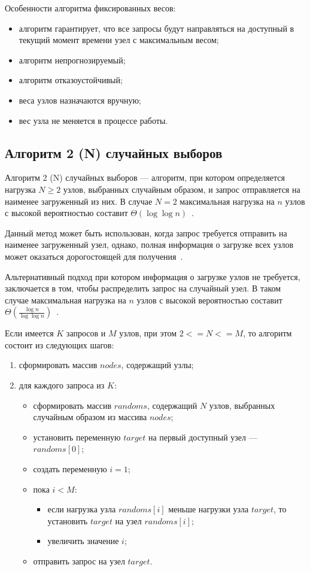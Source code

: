 Особенности алгоритма фиксированных весов:
\begin{itemize}
	\item алгоритм гарантирует, что все запросы будут направляться на доступный в текущий момент времени узел с максимальным весом;
	\item алгоритм непрогнозируемый;
	\item алгоритм отказоустойчивый;
	\item веса узлов назначаются вручную;
	\item вес узла не меняется в процессе работы.
\end{itemize}

\subsection{Алгоритм 2 (N) случайных выборов}

Алгоритм 2 (N) случайных выборов --- алгоритм, при котором определяется нагрузка $N \ge 2$ узлов, выбранных случайным образом, и запрос отправляется на наименее загруженный из них. 
В случае $N=2$ максимальная нагрузка на $n$ узлов с высокой вероятностью составит $\Theta(\log  \log n)$~\cite{pwr2choices}.

Данный метод может быть использован, когда запрос требуется отправить на наименее загруженный узел, однако, полная информация о загрузке всех узлов может оказаться дорогостоящей для получения~\cite{pwr2choices}.

Альтернативный подход при котором информация о загрузке узлов не требуется, заключается в том, чтобы распределить запрос на случайный узел.
В таком случае максимальная нагрузка на $n$ узлов с высокой вероятностью составит $\Theta(\frac{\log n }{\log \log n})$~\cite{pwr2choices}.

Если имеется $K$ запросов и $M$ узлов, при этом $2 <= N <= M$, то алгоритм состоит из следующих шагов:

\begin{enumerate}
	\item сформировать массив $nodes$, содержащий узлы;
	\item для каждого запроса из $K$:
	\begin{itemize}
		\item сформировать массив $randoms$, содержащий $N$ узлов, выбранных случайным образом из массива $nodes$;
		\item установить переменную $target$ на первый доступный узел --- $randoms[0]$;
		\item создать переменную $i = 1$;
		\item пока $i < M$:
		\begin{itemize}
			\item если нагрузка узла $randoms[i]$ меньше нагрузки узла $target$, то установить $target$ на узел $randoms[i]$;
			\item увеличить значение $i$;
		\end{itemize}
		\item отправить запрос на узел $target$.
	\end{itemize}
\end{enumerate}

